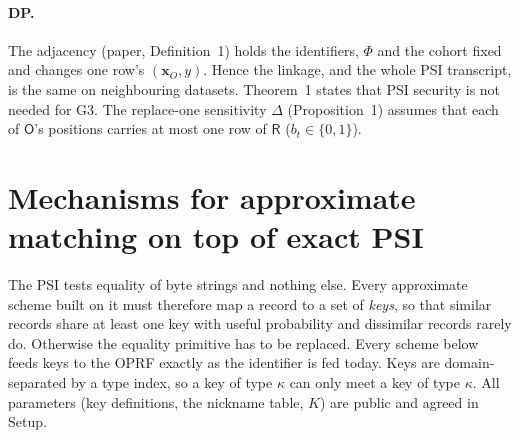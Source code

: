 \documentclass[10pt]{article}
\newcommand{\Rp}{\mathsf{R}}
\newcommand{\Op}{\mathsf{O}}
\newcommand{\bx}{\mathbf x}
\begin{document}
\paragraph{DP.} The adjacency (paper, Definition~1) holds the identifiers, $\Phi$ and the cohort fixed and changes one row's $(\bx_O,y)$. Hence the linkage, and the whole PSI transcript, is the same on neighbouring datasets. Theorem~1 states that PSI security is not needed for G3. The replace-one sensitivity $\Delta$ (Proposition~1) assumes that each of $\Op$'s positions carries at most one row of $\Rp$ ($b_t\in\{0,1\}$).

\section{Mechanisms for approximate matching on top of exact PSI}
\label{sec:mech}

The PSI tests equality of byte strings and nothing else. Every approximate scheme built on it must therefore map a record to a set of \emph{keys}, so that similar records share at least one key with useful probability and dissimilar records rarely do. Otherwise the equality primitive has to be replaced. Every scheme below feeds keys to the OPRF exactly as the identifier is fed today. Keys are domain-separated by a type index, so a key of type $\kappa$ can only meet a key of type $\kappa$. All parameters (key definitions, the nickname table, $K$) are public and agreed in Setup.
\end{document}
